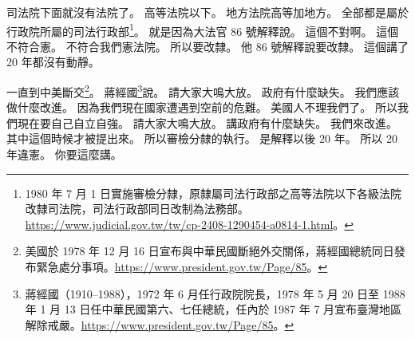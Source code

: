 \hypertarget{w01:cue:1930}{}司法院下面就沒有法院了。
\hypertarget{w01:cue:1931}{}高等法院以下。
\hypertarget{w01:cue:1932}{}地方法院高等加地方。
\hypertarget{w01:cue:1933}{}全部都是屬於行政院所屬的司法行政部\footnote{1980 年 7 月 1 日實施審檢分隸，原隸屬司法行政部之高等法院以下各級法院改隸司法院，司法行政部同日改制為法務部。\url{https://www.judicial.gov.tw/tw/cp-2408-1290454-a0814-1.html}。}。
\hypertarget{w01:cue:1934}{}就是因為大法官 86 號解釋說。
\hypertarget{w01:cue:1935}{}這個不對啊。
\hypertarget{w01:cue:1936}{}這個不符合憲。
\hypertarget{w01:cue:1937}{}不符合我們憲法院。
\hypertarget{w01:cue:1938}{}所以要改隸。
\hypertarget{w01:cue:1939}{}他 86 號解釋說要改隸。
\hypertarget{w01:cue:1940}{}這個講了 20 年都沒有動靜。

\hypertarget{w01:cue:1941}{}一直到中美斷交\footnote{美國於 1978 年 12 月 16 日宣布與中華民國斷絕外交關係，蔣經國總統同日發布緊急處分事項。\url{https://www.president.gov.tw/Page/85}。}。
\hypertarget{w01:cue:1942}{}蔣經國\footnote{蔣經國（1910–1988），1972 年 6 月任行政院院長，1978 年 5 月 20 日至 1988 年 1 月 13 日任中華民國第六、七任總統，任內於 1987 年 7 月宣布臺灣地區解除戒嚴。\url{https://www.president.gov.tw/Page/85}。}說。
\hypertarget{w01:cue:1943}{}請大家大鳴大放。
\hypertarget{w01:cue:1944}{}政府有什麼缺失。
\hypertarget{w01:cue:1945}{}我們應該做什麼改進。
\hypertarget{w01:cue:1946}{}因為我們現在國家遭遇到空前的危難。
\hypertarget{w01:cue:1947}{}美國人不理我們了。
\hypertarget{w01:cue:1948}{}所以我們現在要自己自立自強。
\hypertarget{w01:cue:1949}{}請大家大鳴大放。
\hypertarget{w01:cue:1950}{}講政府有什麼缺失。
\hypertarget{w01:cue:1951}{}我們來改進。
\hypertarget{w01:cue:1952}{}其中這個時候才被提出來。
\hypertarget{w01:cue:1953}{}所以審檢分隸的執行。
\hypertarget{w01:cue:1954}{}是解釋以後 20 年。
\hypertarget{w01:cue:1955}{}所以 20 年違憲。
\hypertarget{w01:cue:1956}{}你要這麼講。

